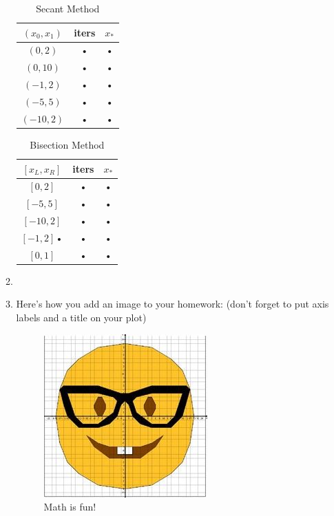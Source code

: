 \documentclass[11pt]{article}
\begin{document}
\begin{enumerate}
\begin{enumerate}
	\begin{table}[H]
	\begin{center}
	\begin{tabular}{|c|c|c|}
	\hline 
	$(x_0, x_1)$ & iters & $x_*$ \\ 
	\hline 
	$(0,2)$ & • & • \\ 
	\hline 
	$(0,10)$ & • & • \\ 
	\hline 
	$(-1, 2)$ & • & • \\ 
	\hline 
	$(-5, 5)$ & • & • \\ 
	\hline 
	$(-10,2)$ & • & • \\ 
	\hline 
	\end{tabular} 
	\caption{Secant Method}
	\end{center}
	\end{table}
	
	
	
	\begin{table}[H]
	\begin{center}
	\begin{tabular}{|c|c|c|}
	\hline 
	$[x_L, x_R]$ & iters & $x_*$ \\ 
	\hline 
	$[0,2]$ & • & • \\ 
	\hline 
	$[-5,5]$ & • & • \\ 
	\hline 
	$[-10,2]$ & • & • \\ 
	\hline 
    $[-1,2]$• & • & • \\ 
	\hline 
	$[0,1]$ & • & • \\ 
	\hline 
	\end{tabular} 
	\caption{Bisection Method}
	\end{center}
	\end{table}



\item 
\item Here's how you add an image to your homework: (don't forget to put axis labels and a title on your plot) \\

\begin{figure}[H]
\begin{center}
\includegraphics[scale=3]{test}
\end{center}
\caption{Math is fun!}
\end{figure}


\end{enumerate}
\end{enumerate}
\end{document}
